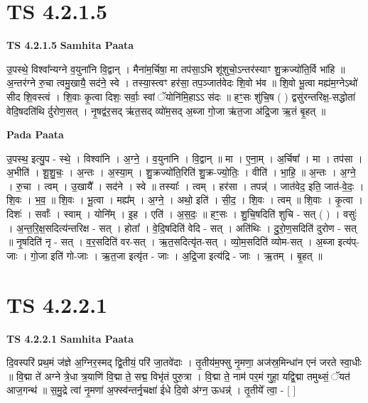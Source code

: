 \documentclass[17pt]{extarticle}
\begin{document}
\section*{ TS 4.2.1.5 }

\textbf{TS 4.2.1.5 } \newline
\textbf{Samhita Paata} \newline

उ॒पस्थे॒ विश्वा᳚न्यग्ने व॒युना॑नि वि॒द्वान् । मैना॑म॒र्चिषा॒ मा तप॑सा॒ऽभि शू॑शुचो॒ऽन्तर॑स्याꣳ शु॒क्रज्यो॑ति॒र्वि भा॑हि ॥ अ॒न्तर॑ग्ने रु॒चा त्वमु॒खायै॒ सद॑ने॒ स्वे । तस्या॒स्त्वꣳ हर॑सा॒ तप॒ञ्जात॑वेदः शि॒वो भ॑व ॥ शि॒वो भू॒त्वा मह्य॑म॒ग्नेऽथो॑ सीद शि॒वस्त्वं । शि॒वाः कृ॒त्वा दिशः॒ सर्वाः॒ स्वां ॅयोनि॑मि॒हाऽऽ स॑दः ॥ हꣳ॒॒सः शु॑चि॒ष ( ) द्वसु॑रन्तरिक्ष॒-सद्धोता॑ वेदि॒षदति॑थि र्दुरोण॒सत् । नृ॒षद्व॑र॒सद् ऋ॑त॒सद् व्यो॑म॒सद् अ॒ब्जा गो॒जा ऋ॑त॒जा अ॑द्रि॒जा ऋ॒तं बृ॒हत् ॥ \newline

\textbf{Pada Paata} \newline

उ॒पस्थ॒ इत्यु॒प - स्थे॒ । विश्वा॑नि । अ॒ग्ने॒ । व॒युना॑नि । वि॒द्वान् ॥ मा । ए॒ना॒म् । अ॒र्चिषा᳚ । मा । तप॑सा । अ॒भीति॑ । शू॒शु॒चः॒ । अ॒न्तः । अ॒स्या॒म् । शु॒क्रज्यो॑ति॒रिति॑ शु॒क्र-ज्यो॒तिः॒ । वीति॑ । भा॒हि॒ ॥ अ॒न्तः । अ॒ग्ने॒ । रु॒चा । त्वम् । उ॒खायै᳚ । सद॑ने । स्वे ॥ तस्याः᳚ । त्वम् । हर॑सा । तपन्न्॑ । जात॑वेद॒ इति॒ जात॑-वे॒दः॒ । शि॒वः । भ॒व॒ ॥ शि॒वः । भू॒त्वा । मह्य᳚म् । अ॒ग्ने॒ । अथो॒ इति॑ । सी॒द॒ । शि॒वः । त्वम् ॥ शि॒वाः । कृ॒त्वा । दिशः॑ । सर्वाः᳚ । स्वाम् । योनि᳚म् । इ॒ह । एति॑ । अ॒स॒दः॒ ॥ हꣳ॒॒सः । शु॒चि॒षदिति॑ शुचि - सत् ( ) । वसुः॑ । अ॒न्त॒रि॒क्ष॒सदित्य॑न्तरिक्ष - सत् । होता᳚ । वे॒दि॒षदिति॑ वेदि - सत् । अति॑थिः । दु॒रो॒ण॒सदिति॑ दुरोण - सत् ॥ नृ॒षदिति॑ नृ - सत् । व॒र॒सदिति॑ वर-सत् । ऋ॒त॒सदित्यृ॑त-सत् । व्यो॒म॒सदिति॑ व्योम-सत् । अ॒ब्जा इत्य॑प्-जाः । गो॒जा इति॑ गो-जाः । ऋ॒त॒जा इत्यृ॑त - जाः । अ॒द्रि॒जा इत्य॑द्रि - जाः । ऋ॒तम् । बृ॒हत् ॥  \newline




\section*{ TS 4.2.2.1 }

\textbf{TS 4.2.2.1 } \newline
\textbf{Samhita Paata} \newline

दि॒वस्परि॑ प्रथ॒मं ज॑ज्ञे अ॒ग्निर॒स्मद् द्वि॒तीयं॒ परि॑ जा॒तवे॑दाः । तृ॒तीय॑म॒फ्सु नृ॒मणा॒ अज॑स्र॒मिन्धा॑न एनं जरते स्वा॒धीः ॥ वि॒द्मा ते॑ अग्ने त्रे॒धा त्र॒याणि॑ वि॒द्मा ते॒ सद्म॒ विभृ॑तं पुरु॒त्रा । वि॒द्मा ते॒ नाम॑ पर॒मं गुहा॒ यद्वि॒द्मा तमुथ्सं॒ ॅयत॑ आज॒गन्थ॑ ॥ स॒मु॒द्रे त्वा॑ नृ॒मणा॑ अ॒फ्स्व॑न्तर्नृ॒चक्षा॑ ईधे दि॒वो अ॑ग्न॒ ऊधन्न्॑ । तृ॒तीये᳚ त्वा॒ - [  ] \newline
\end{document}
